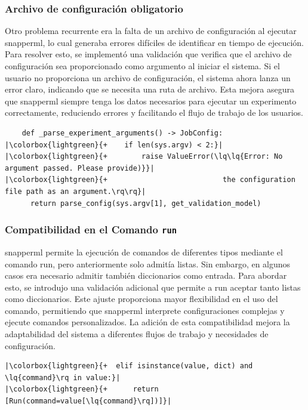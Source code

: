 \subsubsection{Archivo de configuración obligatorio}
Otro problema recurrente era la falta de un archivo de configuración al ejecutar \Gls{snapperml}, lo cual generaba errores difíciles de identificar en tiempo de ejecución. Para resolver esto, se implementó una validación que verifica que el archivo de configuración sea proporcionado como argumento al iniciar el sistema. Si el usuario no proporciona un archivo de configuración, el sistema ahora lanza un error claro, indicando que se necesita una ruta de archivo. Esta mejora asegura que \Gls{snapperml} siempre tenga los datos necesarios para ejecutar un experimento correctamente, reduciendo errores y facilitando el flujo de trabajo de los usuarios.
\begin{verbatim}
    def _parse_experiment_arguments() -> JobConfig:
|\colorbox{lightgreen}{+    if len(sys.argv) < 2:}|
|\colorbox{lightgreen}{+        raise ValueError(\lq\lq{Error: No argument passed. Please provide)}}|
|\colorbox{lightgreen}{+                           the configuration file path as an argument.\rq\rq}|
      return parse_config(sys.argv[1], get_validation_model)
\end{verbatim}

\subsubsection{Compatibilidad en el Comando \texttt{run}}
\Gls{snapperml} permite la ejecución de comandos de diferentes tipos mediante el comando run, pero anteriormente solo admitía listas. Sin embargo, en algunos casos era necesario admitir también diccionarios como entrada. Para abordar esto, se introdujo una validación adicional que permite a run aceptar tanto listas como diccionarios. Este ajuste proporciona mayor flexibilidad en el uso del comando, permitiendo que \Gls{snapperml} interprete configuraciones complejas y ejecute comandos personalizados. La adición de esta compatibilidad mejora la adaptabilidad del sistema a diferentes flujos de trabajo y necesidades de configuración.

\begin{verbatim}
|\colorbox{lightgreen}{+  elif isinstance(value, dict) and \lq{command}\rq in value:}|
|\colorbox{lightgreen}{+      return [Run(command=value[\lq{command}\rq])]}|
\end{verbatim}

